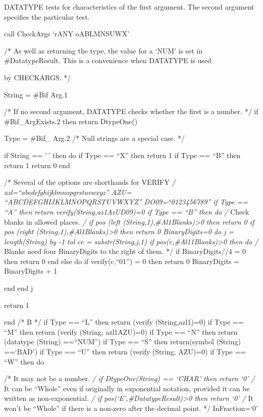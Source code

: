 DATATYPE tests for characteristics of the first argument. The second
argument specifies the particular test.

call CheckArgs `rANY oABLMNSUWX'

/* As well as returning the type, the value for a `NUM' is set in
\#DatatypeResult. This is a convenience when DATATYPE is used

by CHECKARGS. */

String = \#Bif Arg.1

/* If no second argument, DATATYPE checks whether the first is a number.
*/ if \#Bif\_ArgExists.2 then return DtypeOne()

Type = \#Bif\_ Arg.2 /* Null strings are a special case. */

if String == '\,' then do if Type == ``X'' then return 1 if Type ==
``B'' then return 1 return 0 end

/* Several of the options are shorthands for VERIFY \emph{/
azl=``abcdefghijklmnopqrstuvwxyz'' AZU= ``ABCDEFGHIJKLMNOPQRSTUVWXYZ''
DO09=``0123456789'' if Type == ``A'' then return
verify(String,az1\textbar\textbar AzU\textbar\textbar D09)=0 if Type ==
``B'' then do /} Check blanks in allowed places. \emph{/ if pos (left
(String,1),\#Al1Blanks)\textgreater0 then return 0 if pos (right
(String,1),\#Al1Blanks)\textgreater0 then return 0 BinaryDigits=0 do j =
length(String) by -1 tol ce = substr(String,j,1) if
pos(c,\#Al11Blanks)\textgreater0 then do /} Blanks need four
BinaryDigits to the right of them. */ if BinaryDigits//4 = 0 then return
0 end else do if verify(c,``01'') = 0 then return 0 BinaryDigits =
BinaryDigits + 1

end end j

return 1

end /* B */ if Type == ``L'' then return (verify (String,azl1)=0) if
Type == ``M'' then return (verify (String, azl1\textbar\textbar AZU)=0)
if Type == ``N'' then return (datatype (String) ==``NUM'') if Type ==
``S'' then return(symbol (String) ==`BAD') if Type == ``U'' then return
(verify (String, AZU)=0) if Type == ``W'' then do

/* It may not be a number. \emph{/ if DtypeOne(String) == `CHAR' then
return `0' /} It can be ``Whole'' even if originally in exponential
notation, provided it can be written as non-exponential. \emph{/ if
pos(`E',\#DatatypeResult)\textgreater0 then return `0' /} It won't be
``Whole'' if there is a non-zero after the decimal point. */
InFraction=`0'

